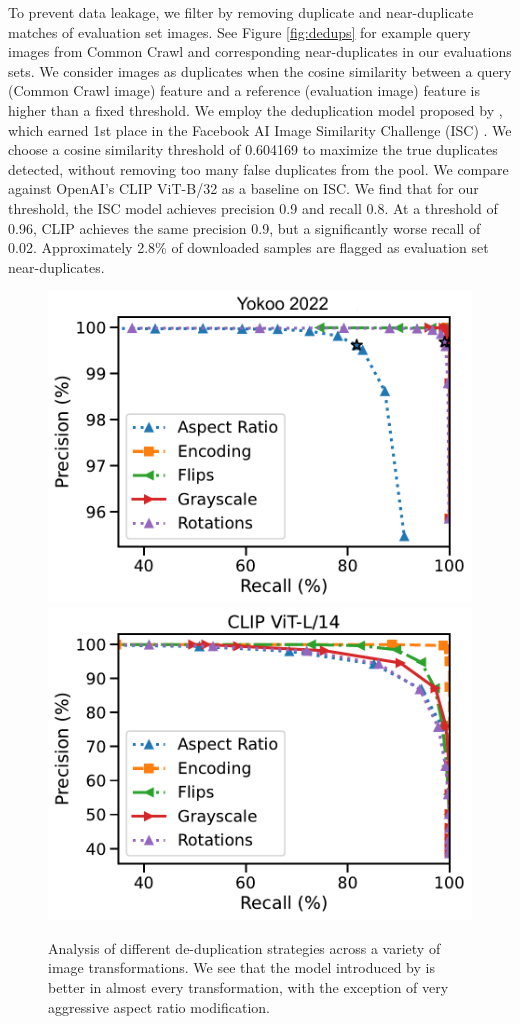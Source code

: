 To prevent data leakage, we filter \pool by removing duplicate and near-duplicate matches of evaluation set images. See Figure \ref{fig:dedups} for example query images from Common Crawl and corresponding near-duplicates in our evaluations sets. We consider images as duplicates when the cosine similarity between a query (Common Crawl image) feature and a reference (evaluation image) feature is higher than a fixed threshold. We employ the deduplication model proposed by \citet{Yokoo2021Dedup}, which earned 1st place in the Facebook AI Image Similarity Challenge (ISC) \cite{douze2021isc}. We choose a cosine similarity threshold of 0.604169 to maximize the true duplicates detected, without removing too many false duplicates from the pool. We compare against OpenAI's CLIP ViT-B/32 as a baseline on ISC. We find that for our threshold, the ISC model achieves precision 0.9 and recall 0.8. At a threshold of 0.96, CLIP achieves the same precision 0.9, but a significantly worse recall of 0.02. Approximately 2.8\% of downloaded samples are flagged as evaluation set near-duplicates.

\begin{figure}[t]
    \centering
    \includegraphics[width=0.48\linewidth]{figures/pr_curve_all_.pdf}
    \includegraphics[width=0.48\linewidth]{figures/pr_curve_all_clip.pdf}
    \caption{Analysis of different de-duplication strategies across a variety of image transformations. We see that the model introduced by \citet{Yokoo2021Dedup} is better in almost every transformation, with the exception of very aggressive aspect ratio modification.}
    \label{fig:dedup-analysis}
\end{figure}

